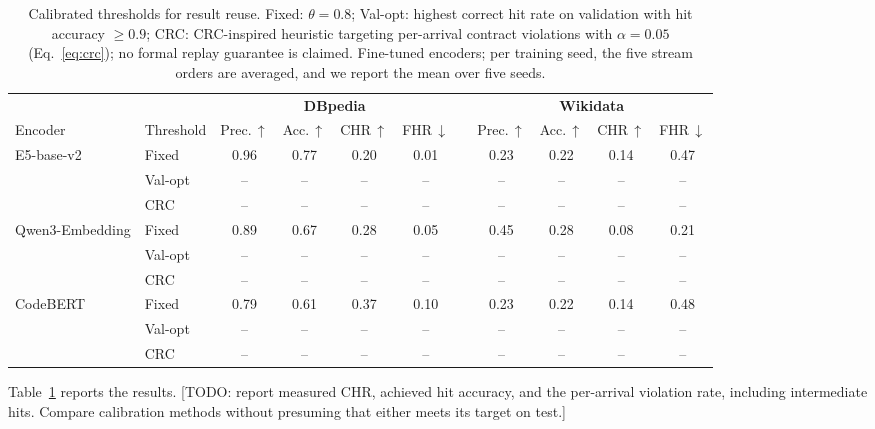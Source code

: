\documentclass[runningheads]{llncs}
\newcommand{\hp}[1]{{\color{red!75!black}#1}}
\begin{document}
\begin{table}[t]
\centering
\caption{Calibrated thresholds for result reuse. Fixed: $\theta = 0.8$;
Val-opt: highest correct hit rate on validation with hit accuracy $\geq 0.9$;
CRC: CRC-inspired heuristic targeting per-arrival contract violations
with $\alpha = 0.05$ (Eq.~\ref{eq:crc}); no formal replay guarantee is claimed.
Fine-tuned encoders; per training seed, the five stream orders are
averaged, and we report the mean over five seeds.}
\label{tab:calibration}
\small
\setlength{\tabcolsep}{4pt}
\renewcommand{\arraystretch}{1.1}
\begin{adjustbox}{max width=\textwidth}
\begin{tabular}{ll cccc p{0pt} cccc}
\toprule
& & \multicolumn{4}{c}{\textbf{DBpedia}} & & \multicolumn{4}{c}{\textbf{Wikidata}}\\
\cmidrule(lr){3-6}\cmidrule(lr){8-11}
Encoder & Threshold & Prec.\,$\uparrow$ & Acc.\,$\uparrow$ & CHR\,$\uparrow$ & FHR\,$\downarrow$ & & Prec.\,$\uparrow$ & Acc.\,$\uparrow$ & CHR\,$\uparrow$ & FHR\,$\downarrow$\\
\midrule
E5-base-v2 & Fixed & 0.96 & 0.77 & 0.20 & 0.01 & & 0.23 & 0.22 & 0.14 & 0.47 \\
 & Val-opt & \hp{--} & \hp{--} & \hp{--} & \hp{--} & & \hp{--} & \hp{--} & \hp{--} & \hp{--} \\
 & CRC & \hp{--} & \hp{--} & \hp{--} & \hp{--} & & \hp{--} & \hp{--} & \hp{--} & \hp{--} \\
\midrule
Qwen3-Embedding & Fixed & 0.89 & 0.67 & 0.28 & 0.05 & & 0.45 & 0.28 & 0.08 & 0.21 \\
 & Val-opt & \hp{--} & \hp{--} & \hp{--} & \hp{--} & & \hp{--} & \hp{--} & \hp{--} & \hp{--} \\
 & CRC & \hp{--} & \hp{--} & \hp{--} & \hp{--} & & \hp{--} & \hp{--} & \hp{--} & \hp{--} \\
\midrule
CodeBERT & Fixed & 0.79 & 0.61 & 0.37 & 0.10 & & 0.23 & 0.22 & 0.14 & 0.48 \\
 & Val-opt & \hp{--} & \hp{--} & \hp{--} & \hp{--} & & \hp{--} & \hp{--} & \hp{--} & \hp{--} \\
 & CRC & \hp{--} & \hp{--} & \hp{--} & \hp{--} & & \hp{--} & \hp{--} & \hp{--} & \hp{--} \\
\bottomrule
\end{tabular}
\end{adjustbox}
\end{table}

Table~\ref{tab:calibration} reports the results.
\hp{[TODO: report measured CHR, achieved hit accuracy, and the per-arrival
violation rate, including intermediate hits. Compare calibration methods
without presuming that either meets its target on test.]}
\end{document}
